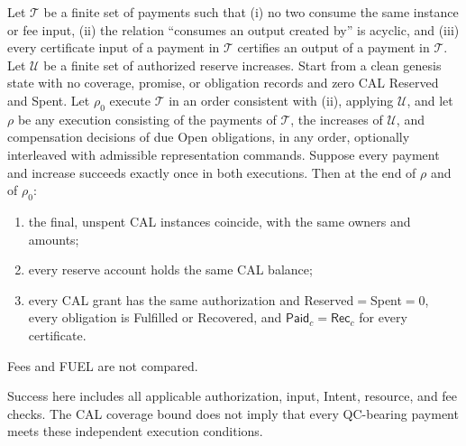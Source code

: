 \begin{theorem}
\label{thm:security-neutrality}
Let $\mathcal T$ be a finite set of payments such that (i) no two consume
the same instance or fee input, (ii) the relation ``consumes an output
created by'' is acyclic, and (iii) every certificate input of a payment in
$\mathcal T$ certifies an output of a payment in $\mathcal T$. Let
$\mathcal U$ be a finite set of authorized reserve increases. Start from a
clean genesis state with no coverage, promise, or obligation records and
zero CAL Reserved and Spent. Let $\rho_0$ execute $\mathcal T$ in an order
consistent with (ii), applying $\mathcal U$, and let $\rho$ be any
execution consisting of the payments of $\mathcal T$, the increases of
$\mathcal U$, and compensation decisions of due Open obligations, in any
order, optionally interleaved with admissible representation commands.
Suppose every payment and increase succeeds exactly once in both
executions. Then at the end of $\rho$ and of $\rho_0$:
\begin{enumerate}
\item the final, unspent CAL instances coincide, with the same owners and
amounts;
\item every reserve account holds the same CAL balance;
\item every CAL grant has the same authorization and
Reserved$=$Spent$=0$, every obligation is Fulfilled or Recovered, and
$\mathsf{Paid}_c=\mathsf{Rec}_c$ for every certificate.
\end{enumerate}
Fees and FUEL are not compared.
\end{theorem}
Success here includes all applicable authorization, input, Intent,
resource, and fee checks. The CAL coverage bound does not imply that
every QC-bearing payment meets these independent execution conditions.
